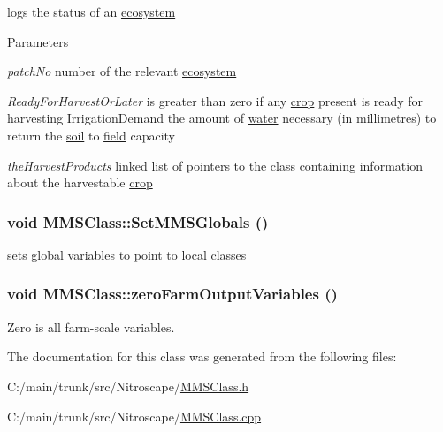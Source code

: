 logs the status of an \hyperlink{classecosystem}{ecosystem} 
\begin{DoxyParams}{Parameters}
\item[{\em patchNo}]number of the relevant \hyperlink{classecosystem}{ecosystem} \item[{\em ReadyForHarvestOrLater}]is greater than zero if any \hyperlink{classcrop}{crop} present is ready for harvesting  IrrigationDemand the amount of \hyperlink{classwater}{water} necessary (in millimetres) to return the \hyperlink{classsoil}{soil} to \hyperlink{classfield}{field} capacity \item[{\em theHarvestProducts}]linked list of pointers to the class containing information about the harvestable \hyperlink{classcrop}{crop} \end{DoxyParams}
\hypertarget{class_m_m_s_class_a9cfb93d7cb67ba68a0a37d5bbea8fb4b}{
\subsubsection[{SetMMSGlobals}]{\setlength{\rightskip}{0pt plus 5cm}void MMSClass::SetMMSGlobals ()}}
\label{class_m_m_s_class_a9cfb93d7cb67ba68a0a37d5bbea8fb4b}


sets global variables to point to local classes \hypertarget{class_m_m_s_class_a4e86f78741f81b1fd9532da0cf77748c}{
\subsubsection[{zeroFarmOutputVariables}]{\setlength{\rightskip}{0pt plus 5cm}void MMSClass::zeroFarmOutputVariables ()}}
\label{class_m_m_s_class_a4e86f78741f81b1fd9532da0cf77748c}


Zero is all farm-\/scale variables. 

The documentation for this class was generated from the following files:\begin{DoxyCompactItemize}
\item 
C:/main/trunk/src/Nitroscape/\hyperlink{_m_m_s_class_8h}{MMSClass.h}\item 
C:/main/trunk/src/Nitroscape/\hyperlink{_m_m_s_class_8cpp}{MMSClass.cpp}\end{DoxyCompactItemize}
